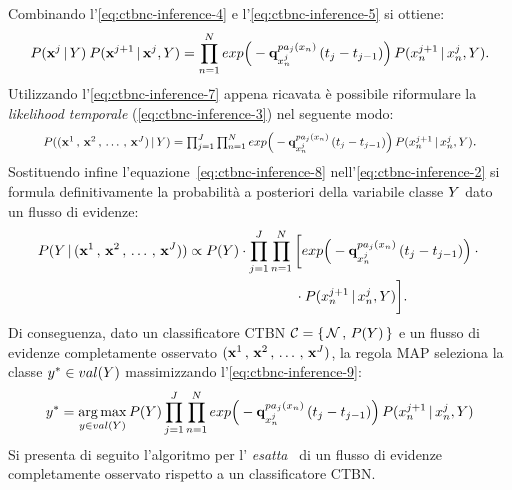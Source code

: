 Combinando l'\autoref{eq:ctbnc-inference-4} e l'\autoref{eq:ctbnc-inference-5} si ottiene:
\footnotesize
\begin{equation}\label{eq:ctbnc-inference-7}
P(\mathbf{x}^j\,\arrowvert\,\mathnormal{Y})\:P(\mathbf{x}^{j+1}\,\arrowvert\,\mathbf{x}^j,\mathnormal{Y})=\prod_{n=1}^N exp\Big(-\boldsymbol{\textbf{\text{q}}}_{\mathnormal{x}_n^j}^{pa_j(\mathnormal{x}_n)}\,(t_j - t_{j-1})\Big)\,P(\mathnormal{x}_n^{j+1}\,\arrowvert\,\mathnormal{x}_n^j,\mathnormal{Y})\text{\normalsize .}
\end{equation}
\normalsize
Utilizzando l'\autoref{eq:ctbnc-inference-7} appena ricavata è possibile riformulare la \emph{likelihood temporale} (\autoref{eq:ctbnc-inference-3}) nel seguente modo:
\begin{equation}\label{eq:ctbnc-inference-8}
\resizebox{.89\hsize}{!}{$P(\evidencestream{J}\,\arrowvert\,\setel{Y})=\prod_{j=1}^{J}\prod_{n=1}^N exp\Big(-\param{q}_{\setel{x}_n^j}^{pa_j(\setel{x}_n)}\,(t_j - t_{j-1})\Big)\,P(\setel{x}_n^{j+1}\,\arrowvert\,\setel{x}_n^j,\setel{Y})$}\text{.}
\end{equation}
Sostituendo infine l'equazione~\autoref{eq:ctbnc-inference-8} nell'\autoref{eq:ctbnc-inference-2} si formula definitivamente la probabilità a posteriori della variabile classe $\mathnormal{Y}$ dato un flusso di evidenze:
\begin{align}\label{eq:ctbnc-inference-9}
P(\mathnormal{Y}\,\arrowvert\,(\mathbf{x}^1\,,\,\mathbf{x}^2\,,\,\dotsc\,,\,\mathbf{x}^{J})) &\propto P(\mathnormal{Y}) \cdot \prod_{j=1}^{J}\prod_{n=1}^N \bigg[ exp\Big(-\boldsymbol{\textbf{\text{q}}}_{\mathnormal{x}_n^j}^{pa_j(\mathnormal{x}_n)}\,(t_j - t_{j-1})\Big) \cdot \bigg.\nonumber\\
& \qquad \bigg.{} \qquad \qquad \qquad \! \! \cdot P(\mathnormal{x}_n^{j+1}\,\arrowvert\,\mathnormal{x}_n^j,\mathnormal{Y}) \bigg]\text{.}
\end{align}
Di conseguenza, dato un classificatore \acs{CTBN} $\mathcal{C}=\{\,\mathcal{N}\,,\,P(\mathnormal{Y})\,\}$ e un flusso di evidenze completamente osservato $(\mathbf{x}^1\,,\,\mathbf{x}^2\,,\,\dotsc\,,\,\mathbf{x}^{J})$, la regola \acs{MAP} seleziona la classe $\mathnormal{y}^* \in val(\mathnormal{Y})$ massimizzando l'\autoref{eq:ctbnc-inference-9}:
\begin{equation}\label{eq:ctbnc-inference-10}
\mathnormal{y}^*= \operatorname*{arg\,max}_{\mathnormal{y}\in val(\mathnormal{Y})}P(\mathnormal{Y})\prod_{j=1}^{J}\prod_{n=1}^N exp\Big(-\boldsymbol{\textbf{\text{q}}}_{\mathnormal{x}_n^j}^{pa_j(\mathnormal{x}_n)}\,(t_j - t_{j-1})\Big)\,P(\mathnormal{x}_n^{j+1}\,\arrowvert\,\mathnormal{x}_n^j,\mathnormal{Y})
\end{equation}
Si presenta di seguito l'algoritmo per l'\emph{ esatta}~\citep{Stella2012} di un flusso di evidenze completamente osservato rispetto a un classificatore \acs{CTBN}.

